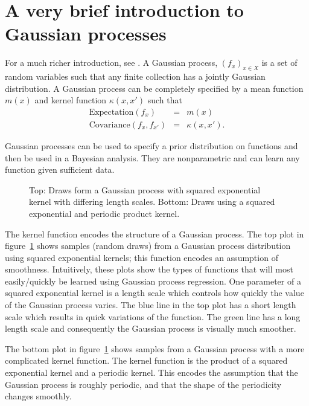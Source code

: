 \documentclass[preprint,authoryear,12pt]{elsarticle}
\begin{document}
\appendix

\section{A very brief introduction to Gaussian processes}

For a much richer introduction, see \cite{Rasmussen2006}.
A Gaussian process, $(f_x)_{x \in X}$ is a set of random variables such that any finite collection has a jointly Gaussian distribution.
A Gaussian process can be completely specified by a mean function $m(x)$ and kernel function $\kappa (x, x')$ such that
\begin{eqnarray}
\text{Expectation}(f_x) & = & m(x) \\
\text{Covariance}(f_x, f_{x'}) & = & \kappa (x, x').
\end{eqnarray}

Gaussian processes can be used to specify a prior distribution on functions and then be used in a Bayesian analysis.
They are nonparametric and can learn any function given sufficient data.

\begin{figure}[ht]
  \begin{center}
    
  \end{center}
  \caption{Top: Draws form a Gaussian process with squared exponential kernel with differing length scales. Bottom: Draws using a squared exponential and periodic product kernel.}
  \label{fig:gp_samples}
\end{figure}

The kernel function encodes the structure of a Gaussian process.
The top plot in figure~\ref{fig:gp_samples} shows samples (random draws) from a Gaussian process distribution using squared exponential kernels; this function encodes an assumption of smoothness.
Intuitively, these plots show the types of functions that will most easily/quickly be learned using Gaussian process regression.
One parameter of a squared exponential kernel is a length scale which controls how quickly the value of the Gaussian process varies.
The blue line in the top plot has a short length scale which results in quick variations of the function.
The green line has a long length scale and consequently the Gaussian process is visually much smoother.

The bottom plot in figure~\ref{fig:gp_samples} shows samples from a Gaussian process with a more complicated kernel function.
The kernel function is the product of a squared exponential kernel and a periodic kernel.
This encodes the assumption that the Gaussian process is roughly periodic, and that the shape of the periodicity changes smoothly.
\end{document}
